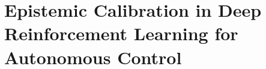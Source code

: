 \documentclass[11pt,a4paper,oneside]{book}
\begin{document}
\setcounter{chapter}{2} %
\chapter{Epistemic Calibration in Deep Reinforcement Learning for Autonomous Control}







\newpage
\printbibliography[heading=subbibliography, title={References}]
\end{document}
